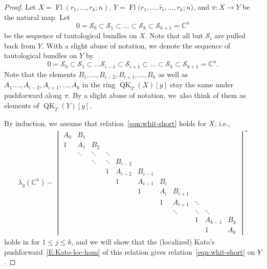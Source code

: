 \documentclass[11pt]{article}
\numberwithin{equation}{section}
\numberwithin{equation}{section}
\theoremstyle{definition}
\DeclareMathOperator{\Fl}{Fl}
\DeclareMathOperator{\QK}{QK}
\def\loc{{\mathrm{loc}}}
\newcommand{\C}{{\mathbb C}}
\newcommand{\cS}{{\mathcal S}}
\begin{document}
\begin{proof}
Let $X=\Fl(r_1,\dots,r_k;n)$, $Y=\Fl\bigl(r_1,\dots, \widehat{r}_i,\dots, r_k;n\bigr)$, and $\pi\colon X\to Y$ be the natural map. Let
\[
 0=\cS_0\subset\cS_1\subset\dots\subset\cS_k\subset\cS_{k+1}=\C^n
\]
be the sequence of tautological bundles on $X$. Note that all but $\cS_i$ are pulled back from $Y$. With a slight abuse of notation, we denote the sequence of tautological bundles on $Y$ by
\[
 0=\cS_0\subset\cS_1\subset\dots\cS_{i-1}\subset\cS_{i+1}\subset\dots\subset\cS_k\subset\cS_{k+1}=\C^n.
\]
Note that the elements $B_1,\dots,B_{i-2},B_{i+1},\dots,B_k$ as well as $A_1.\dots, A_{i-2},A_{i+1},\dots,A_k$ in the ring $\QK_T(X)[y]$ stay the same under pushforward along $\pi$. By a slight abuse of notation, we~also think of them as elements of $\QK_T(Y)[y]$.

By induction, we assume that relation~\eqref{eqn:whit-short} holds for $X$, i.e.,
\begin{gather}\label{eqn:whitX}
 \lambda_y(\C^n)-\begin{vmatrix}
 A_0 & B_1 & & & & & & & & & \\
 1 & A_1 &B_2 & & & & & & & & \\
 & \ddots & \ddots & \ddots & & & & & & & \\
 & & \ddots & \ddots & B_{i-2} & & &\\ & & & 1 & A_{i-2} & B_{i-1} & & & & &\\ & & & & 1 & A_{i-1} & B_i & & & &\\
 & & & & & 1 & A_i & B_{i+1} & & &\\
 & & & & & & 1 & A_{i+1} & \ddots & &
 \\
 & & & & & & & \ddots & \ddots & \ddots & \\
 & & & & & & & & 1 & A_{k-1} & B_{k}\\
 & & & & & & & & & 1 & A_{k}
 \end{vmatrix}^\star
\end{gather}
holds in \smash{$\QK_T^{\loc(\mathbf{r})}(X)[y]$}
for $1 \le j \le k$, and we will show that the (localized) Kato's pushforward~\eqref{E:Kato-loc-hom} of this relation gives relation~\eqref{eqn:whit-short} on $Y$.


\end{proof}
\end{document}
